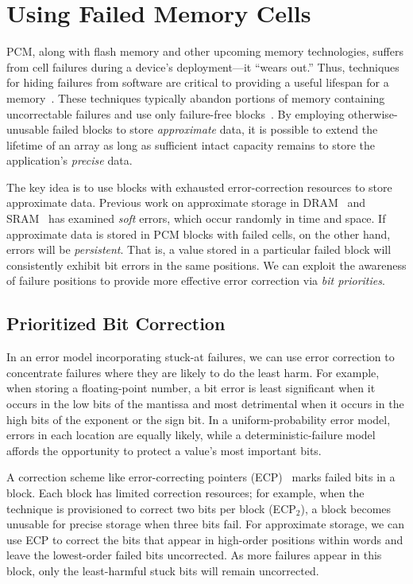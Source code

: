 \section{Using Failed Memory Cells}
\label{approxstorage:sec:recycling}

PCM, along with flash memory and other upcoming memory technologies, suffers from cell
failures during a device's deployment---it ``wears out.'' Thus, techniques for hiding failures from
software are critical to providing a useful lifespan for a
memory~\cite{pcm-dram-alt}.
These techniques typically abandon portions of memory containing
uncorrectable failures and use only failure-free blocks~\cite{ecp,payg,safer}.
By employing otherwise-unusable failed blocks to
store \emph{approximate} data, it is possible to extend the
lifetime of an array as long as sufficient intact capacity remains to
store the application's \emph{precise} data.

The key idea is to use blocks with exhausted
error-correction resources to store approximate data. Previous work on
approximate storage in DRAM~\cite{flikker} and SRAM~\cite{truffle} has examined
\emph{soft} errors, which occur randomly in time and space.
If approximate data is stored in PCM blocks with failed cells, on the other
hand, errors will be
\emph{persistent}. That is, a value stored in a particular failed
block will consistently exhibit bit errors in the same positions.
We can
exploit the awareness of failure positions to provide more effective
error correction via \emph{bit priorities}.

\subsection{Prioritized Bit Correction}
\label{approxstorage:sec:bitprior}

In an error model incorporating
stuck-at failures, we can use error correction to concentrate
failures
where they are likely to do the least harm. For example, when storing
a floating-point number, a bit error is least significant when it
occurs in the low bits of the mantissa and most detrimental when it
occurs in the high bits of the exponent or the sign bit. In a uniform-probability
error model, errors in each location are equally likely, while a
deterministic-failure model affords the opportunity to protect
a value's most important bits.

A correction scheme like error-correcting pointers (ECP)~\cite{ecp} marks failed bits in a
block. Each block has limited correction resources; for example,
when the technique is provisioned to correct two bits per block (ECP$_2$),
a block becomes unusable for precise storage when three
bits fail. For approximate storage, we
can use ECP to correct the bits that appear in high-order positions
within words and leave the lowest-order failed bits uncorrected. As
more failures appear in this block, only the least-harmful stuck bits will
remain uncorrected.

